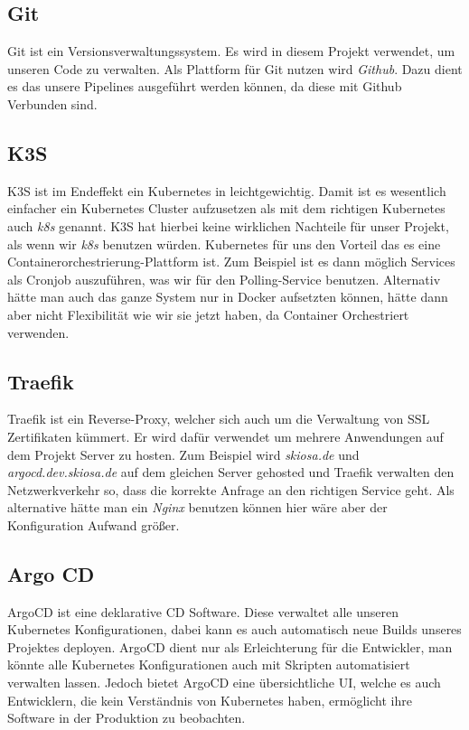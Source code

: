 \subsection{Git}
    Git ist ein Versionsverwaltungssystem. Es wird in diesem Projekt verwendet, um unseren Code zu verwalten. Als Plattform für Git nutzen wird \textit{Github}.
    Dazu dient es das unsere Pipelines ausgeführt werden können, da diese mit Github Verbunden sind.
\subsection{K3S}
    K3S ist im Endeffekt ein Kubernetes in leichtgewichtig. Damit ist es wesentlich einfacher ein Kubernetes Cluster aufzusetzen als mit dem richtigen Kubernetes auch \textit{k8s} genannt.
    K3S hat hierbei keine wirklichen Nachteile für unser Projekt, als wenn wir \textit{k8s} benutzen würden. Kubernetes für uns den Vorteil das es eine Containerorchestrierung-Plattform ist.
    Zum Beispiel ist es dann möglich Services als Cronjob auszuführen, was wir für den Polling-Service benutzen. Alternativ hätte man auch das ganze System nur in Docker aufsetzten können, hätte dann aber 
    nicht Flexibilität wie wir sie jetzt haben, da Container Orchestriert verwenden.
\subsection{Traefik}
    Traefik ist ein Reverse-Proxy, welcher sich auch um die Verwaltung von SSL Zertifikaten kümmert. Er wird dafür verwendet um mehrere Anwendungen auf dem Projekt Server zu hosten.
    Zum Beispiel wird \textit{skiosa.de} und \textit{argocd.dev.skiosa.de} auf dem gleichen Server gehosted und Traefik verwalten den Netzwerkverkehr so, dass die korrekte Anfrage an den richtigen Service geht.
    Als alternative hätte man ein \textit{Nginx} benutzen können hier wäre aber der Konfiguration Aufwand größer.
\subsection{Argo CD}
    ArgoCD ist eine deklarative \ac{CD} Software. Diese verwaltet alle unseren Kubernetes Konfigurationen, dabei kann es auch automatisch neue Builds unseres Projektes deployen.
    ArgoCD dient nur als Erleichterung für die Entwickler, man könnte alle Kubernetes Konfigurationen auch mit Skripten automatisiert verwalten lassen. Jedoch bietet ArgoCD eine übersichtliche UI,
    welche es auch Entwicklern, die kein Verständnis von Kubernetes haben, ermöglicht ihre Software in der Produktion zu beobachten.
